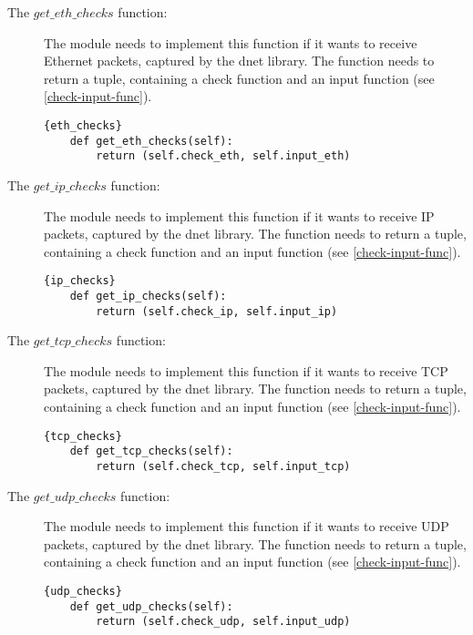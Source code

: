 \documentclass[a4paper, 11pt]{article}
\begin{document}
                \begin{description}
                    \item[The $get\_eth\_checks$ function:] The module needs to implement this function if it wants to receive Ethernet packets, captured by the dnet library. The function needs to return a tuple, containing a check function and an input function (see \ref{check-input-func}).

                    \begin{lstlisting}[caption=Ethernet checks]{eth_checks}
    def get_eth_checks(self):
        return (self.check_eth, self.input_eth)
                    \end{lstlisting}
                    
                    \item[The $get\_ip\_checks$ function:] The module needs to implement this function if it wants to receive IP packets, captured by the dnet library. The function needs to return a tuple, containing a check function and an input function (see \ref{check-input-func}).

                    \begin{lstlisting}[caption=IP checks]{ip_checks}
    def get_ip_checks(self):
        return (self.check_ip, self.input_ip)
                    \end{lstlisting}

                    \item[The $get\_tcp\_checks$ function:] The module needs to implement this function if it wants to receive TCP packets, captured by the dnet library. The function needs to return a tuple, containing a check function and an input function (see \ref{check-input-func}).

                    \begin{lstlisting}[caption=TCP checks]{tcp_checks}
    def get_tcp_checks(self):
        return (self.check_tcp, self.input_tcp)
                    \end{lstlisting}

                    \item[The $get\_udp\_checks$ function:] The module needs to implement this function if it wants to receive UDP packets, captured by the dnet library. The function needs to return a tuple, containing a check function and an input function (see \ref{check-input-func}).

                    \begin{lstlisting}[caption=UDP checks]{udp_checks}
    def get_udp_checks(self):
        return (self.check_udp, self.input_udp)
                    \end{lstlisting}
                \end{description}
\end{document}
